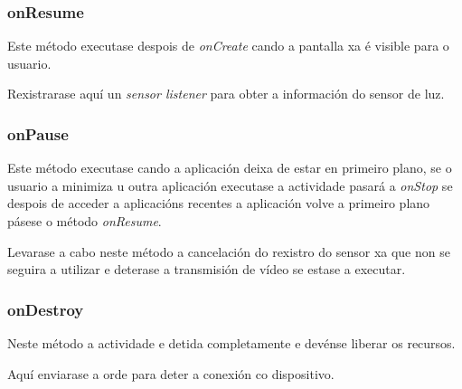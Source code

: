 \subsubsection{onResume}
Este método executase despois de \emph{onCreate} cando a pantalla xa é visible para o usuario.

Rexistrarase aquí un \emph{sensor listener} para obter a información do sensor de luz.
\subsubsection{onPause}
Este método executase cando a aplicación deixa de estar en primeiro plano, se o usuario a minimiza u outra aplicación executase a actividade pasará a \emph{onStop} se despois de acceder a aplicacións recentes a aplicación volve a primeiro plano pásese o método \emph{onResume}.

Levarase a cabo neste método a cancelación do rexistro do sensor xa que non se seguira a utilizar e deterase a transmisión de vídeo se estase a executar.
\subsubsection{onDestroy}
Neste método a actividade e detida completamente e devénse liberar os recursos.

Aquí enviarase a orde para deter a conexión co dispositivo.

